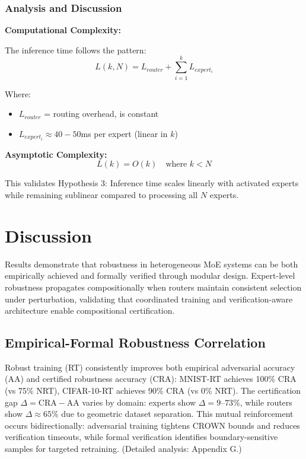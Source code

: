 \documentclass[11pt,a4paper]{article}
\begin{document}
\subsubsection{Analysis and Discussion}

\textbf{Computational Complexity:}

The inference time follows the pattern:
\begin{equation}
    L(k, N) = L_{router} + \sum_{i=1}^k L_{expert_i}
\end{equation}

Where:
\begin{itemize}
    \item $L_{router}$ = routing overhead, is constant
    \item $L_{expert_i} \approx 40-50$ms per expert (linear in $k$)
\end{itemize}

\textbf{Asymptotic Complexity:}
\begin{equation}
    L(k) = O(k) \quad \text{where } k < N
\end{equation}

This validates Hypothesis 3: Inference time scales linearly with activated experts while remaining sublinear compared to processing all $N$ experts.

\section{Discussion}

Results demonstrate that robustness in heterogeneous MoE systems can be both empirically achieved and formally verified through modular design. Expert-level robustness propagates compositionally when routers maintain consistent selection under perturbation, validating that coordinated training and verification-aware architecture enable compositional certification.

\subsection{Empirical-Formal Robustness Correlation}

Robust training (RT) consistently improves both empirical adversarial accuracy (AA) and certified robustness accuracy (CRA): MNIST-RT achieves 100\% CRA (vs 75\% NRT), CIFAR-10-RT achieves 90\% CRA (vs 0\% NRT). The certification gap $\Delta = \text{CRA} - \text{AA}$ varies by domain: experts show $\Delta = 9$--$73\%$, while routers show $\Delta \approx 65\%$ due to geometric dataset separation. This mutual reinforcement occurs bidirectionally: adversarial training tightens CROWN bounds and reduces verification timeouts, while formal verification identifies boundary-sensitive samples for targeted retraining. (Detailed analysis: Appendix G.)
\end{document}
